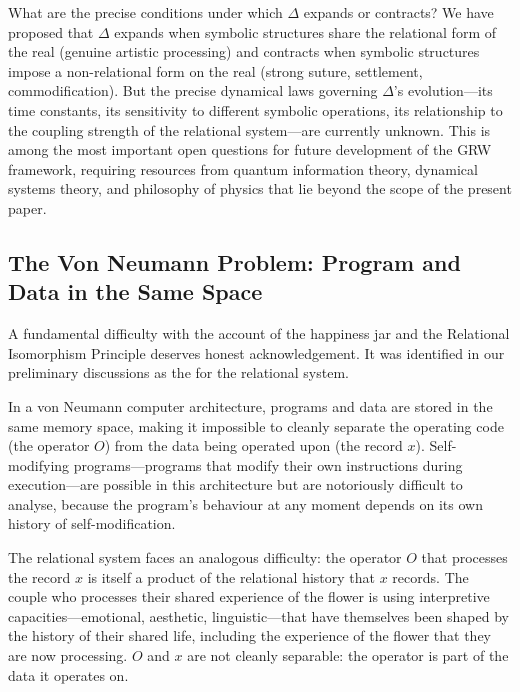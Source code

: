 \begin{openquestion}
What are the precise conditions under which $\Delta$ expands or contracts? We have proposed that $\Delta$ expands when symbolic structures share the relational form of the real (genuine artistic processing) and contracts when symbolic structures impose a non-relational form on the real (strong suture, settlement, commodification). But the precise dynamical laws governing $\Delta$'s evolution---its time constants, its sensitivity to different symbolic operations, its relationship to the coupling strength of the relational system---are currently unknown. This is among the most important open questions for future development of the GRW framework, requiring resources from quantum information theory, dynamical systems theory, and philosophy of physics that lie beyond the scope of the present paper.
\end{openquestion}

\subsection{The Von Neumann Problem: Program and Data in the Same Space}
\label{p15:subsec:vonneumann}

\noindent
A fundamental difficulty with the account of the happiness jar and the Relational Isomorphism Principle deserves honest acknowledgement. It was identified in our preliminary discussions as the  for the relational system.

In a von Neumann computer architecture, programs and data are stored in the same memory space, making it impossible to cleanly separate the operating code (the operator $O$) from the data being operated upon (the record $x$). Self-modifying programs---programs that modify their own instructions during execution---are possible in this architecture but are notoriously difficult to analyse, because the program's behaviour at any moment depends on its own history of self-modification.

The relational system faces an analogous difficulty: the operator $O$ that processes the record $x$ is itself a product of the relational history that $x$ records. The couple who processes their shared experience of the flower is using interpretive capacities---emotional, aesthetic, linguistic---that have themselves been shaped by the history of their shared life, including the experience of the flower that they are now processing. $O$ and $x$ are not cleanly separable: the operator is part of the data it operates on.

